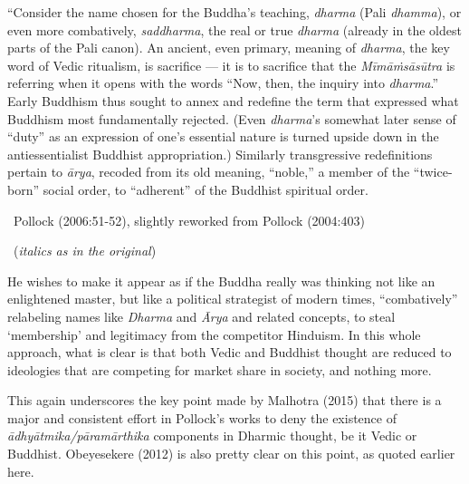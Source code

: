 \begin{myquote}
“Consider the name chosen for the Buddha’s teaching, \textit{dharma} (Pali \textit{dhamma}), or even more combatively, \textit{saddharma}, the real or true \textit{dharma} (already in the oldest parts of the Pali canon). An ancient, even primary, meaning of \textit{dharma}, the key word of Vedic ritualism, is sacriﬁce — it is to sacriﬁce that the \textit{Mīmāṁsāsūtra} is referring when it opens with the words “Now, then, the inquiry into \textit{dharma}.” Early Buddhism thus sought to annex and redeﬁne the term that expressed what Buddhism most fundamentally rejected. (Even \textit{dharma}’s somewhat later sense of “duty” as an expression of one’s essential nature is turned upside down in the antiessentialist Buddhist appropriation.) Similarly transgressive redeﬁnitions pertain to \textit{ārya}, recoded from its old meaning, “noble,” a member of the “twice-born” social order, to “adherent” of the Buddhist spiritual order. 

~\hfill Pollock (2006:51-52), slightly reworked from Pollock (2004:403)
\end{myquote}

\begin{myquote}

~\hfill (\textit{italics as in the original})
\end{myquote}

\newpage

He wishes to make it appear as if the Buddha really was thinking not like an enlightened master, but like a political strategist of modern times, “combatively” relabeling names like \textit{Dharma} and \textit{Ārya} and related concepts, to steal ‘membership’ and legitimacy from the competitor Hinduism. In this whole approach, what is clear is that both Vedic and Buddhist thought are reduced to ideologies that are competing for market share in society, and nothing more.

This again underscores the key point made by Malhotra (2015) that there is a major and consistent effort in Pollock’s works to deny the existence of \textit{ādhyātmika/pāramārthika} components in Dharmic thought, be it Vedic or Buddhist. Obeyesekere (2012) is also pretty clear on this point, as quoted earlier here.


